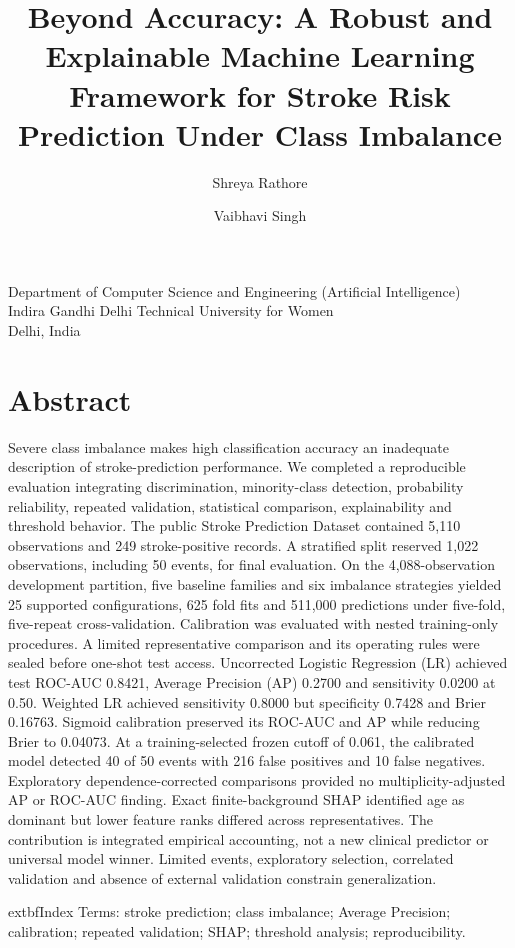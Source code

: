 \documentclass[10pt,twocolumn,letterpaper]{article}
\title{Beyond Accuracy: A Robust and Explainable Machine Learning Framework for Stroke Risk Prediction Under Class Imbalance}
\author{Shreya Rathore \and Vaibhavi Singh}
\date{}
\begin{document}
\maketitle
\begin{center}\small Department of Computer Science and Engineering (Artificial Intelligence)\\Indira Gandhi Delhi Technical University for Women\\Delhi, India\end{center}
\section*{Abstract}
Severe class imbalance makes high classification accuracy an inadequate description of stroke-prediction performance. We completed a reproducible evaluation integrating discrimination, minority-class detection, probability reliability, repeated validation, statistical comparison, explainability and threshold behavior. The public Stroke Prediction Dataset contained 5,110 observations and 249 stroke-positive records. A stratified split reserved 1,022 observations, including 50 events, for final evaluation. On the 4,088-observation development partition, five baseline families and six imbalance strategies yielded 25 supported configurations, 625 fold fits and 511,000 predictions under five-fold, five-repeat cross-validation. Calibration was evaluated with nested training-only procedures. A limited representative comparison and its operating rules were sealed before one-shot test access. Uncorrected Logistic Regression (LR) achieved test ROC-AUC 0.8421, Average Precision (AP) 0.2700 and sensitivity 0.0200 at 0.50. Weighted LR achieved sensitivity 0.8000 but specificity 0.7428 and Brier 0.16763. Sigmoid calibration preserved its ROC-AUC and AP while reducing Brier to 0.04073. At a training-selected frozen cutoff of 0.061, the calibrated model detected 40 of 50 events with 216 false positives and 10 false negatives. Exploratory dependence-corrected comparisons provided no multiplicity-adjusted AP or ROC-AUC finding. Exact finite-background SHAP identified age as dominant but lower feature ranks differed across representatives. The contribution is integrated empirical accounting, not a new clinical predictor or universal model winner. Limited events, exploratory selection, correlated validation and absence of external validation constrain generalization.


	extbf{Index Terms:} stroke prediction; class imbalance; Average Precision; calibration; repeated validation; SHAP; threshold analysis; reproducibility.
\end{document}
